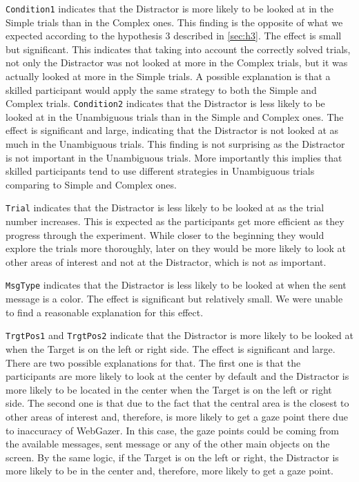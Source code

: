 \texttt{Condition1} indicates that the Distractor is more likely to be looked at in the Simple trials than in the Complex ones. This finding is the opposite of what we expected according to the hypothesis 3 described in \autoref{sec:h3}. The effect is small but significant. This indicates that taking into account the correctly solved trials, not only the Distractor was not looked at more in the Complex trials, but it was actually looked at more in the Simple trials. A possible explanation is that a skilled participant would apply the same strategy to both the Simple and Complex trials. \texttt{Condition2} indicates that the Distractor is less likely to be looked at in the Unambiguous trials than in the Simple and Complex ones. The effect is significant and large, indicating that the Distractor is not looked at as much in the Unambiguous trials. This finding is not surprising as the Distractor is not important in the Unambiguous trials. More importantly this implies that skilled participants tend to use different strategies in Unambiguous trials comparing to Simple and Complex ones.

\texttt{Trial} indicates that the Distractor is less likely to be looked at as the trial number increases. This is expected as the participants get more efficient as they progress through the experiment. While closer to the beginning they would explore the trials more thoroughly, later on they would be more likely to look at other areas of interest and not at the Distractor, which is not as important. 

\texttt{MsgType} indicates that the Distractor is less likely to be looked at when the sent message is a color. The effect is significant but relatively small. We were unable to find a reasonable explanation for this effect.

\texttt{TrgtPos1} and \texttt{TrgtPos2} indicate that the Distractor is more likely to be looked at when the Target is on the left or right side. The effect is significant and large. There are two possible explanations for that. The first one is that the participants are more likely to look at the center by default and the Distractor is more likely to be located in the center when the Target is on the left or right side. The second one is that due to the fact that the central area is the closest to other areas of interest and, therefore, is more likely to get a gaze point there due to inaccuracy of WebGazer. In this case, the gaze points could be coming from the available messages, sent message or any of the other main objects on the screen. By the same logic, if the Target is on the left or right, the Distractor is more likely to be in the center and, therefore, more likely to get a gaze point.

